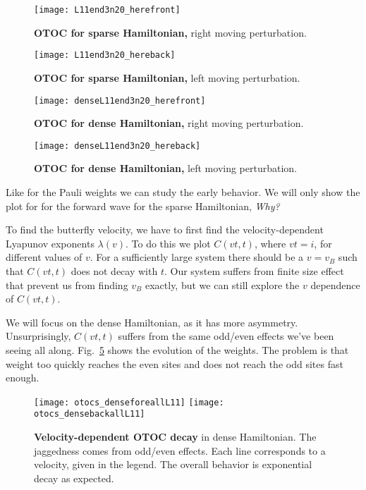 \begin{figure}
	\centering
	\texttt{[image: L11end3n20\_herefront]}
	\caption{\textbf{OTOC for sparse Hamiltonian,} right moving perturbation.}
	\label{fig:L11end3n20_herefront}
\end{figure}

\begin{figure}
	\centering
	\texttt{[image: L11end3n20\_hereback]}
	\caption{\textbf{OTOC for sparse Hamiltonian,} left moving perturbation.}
	\label{fig:L11end3n20_hereback}
\end{figure}

\begin{figure}
	\centering
	\texttt{[image: denseL11end3n20\_herefront]}
	\caption{\textbf{OTOC for dense Hamiltonian,} right moving perturbation.}
	\label{fig:denseL11end3n20_herefront}
\end{figure}

\begin{figure}
	\centering
	\texttt{[image: denseL11end3n20\_hereback]}
	\caption{\textbf{OTOC for dense Hamiltonian,} left moving perturbation.}
	\label{fig:denseL11end3n20_hereback}
\end{figure}

Like for the Pauli weights we can study the early behavior. We will only show the plot for for the forward wave for the sparse Hamiltonian, \emph{Why?}

To find the butterfly velocity, we have to first find the velocity-dependent Lyapunov exponents $\lambda(v)$. To do this we plot $C(vt,t)$, where $vt=i$, for different values of $v$. For a sufficiently large system there should be a $v=v_B$ such that $C(vt,t)$ does not decay with $t$. Our system suffers from finite size effect that prevent us from finding $v_B$ exactly, but we can still explore the $v$ dependence of $C(vt,t)$.

We will focus on the dense Hamiltonian, as it has more asymmetry. Unsurprisingly, $C(vt,t)$ suffers from the same odd/even effects we've been seeing all along. Fig.~\ref{fig:otocs_denseforeallL11} shows the evolution of the weights. The problem is that weight too quickly reaches the even sites and does not reach the odd sites fast enough.

\begin{figure}
	\centering
	\texttt{[image: otocs\_denseforeallL11]}
	\texttt{[image: otocs\_densebackallL11]}
	\caption{\textbf{Velocity-dependent OTOC decay} in dense Hamiltonian. The jaggedness comes from odd/even effects. Each line corresponds to a velocity, given in the legend. The overall behavior is exponential decay as expected.}
	\label{fig:otocs_denseforeallL11}
\end{figure}

